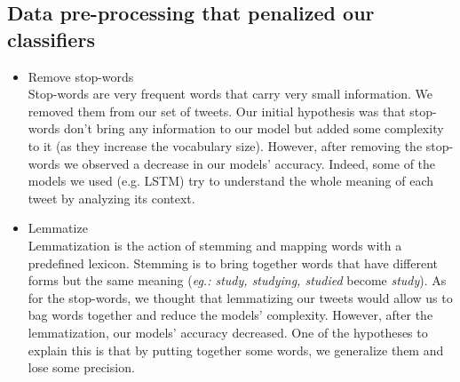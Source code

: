 \documentclass[letterpaper, 10 pt, conference]{ieeeconf}  %
\begin{document}
\subsection{Data pre-processing that penalized our classifiers}
\begin{itemize}
    \item Remove stop-words \ \\
    Stop-words are very frequent words that carry very small information. 
    We removed them from our set of tweets. Our initial hypothesis was that stop-words don't bring any information to our model but added some complexity to it (as they increase the vocabulary size). However, after removing the stop-words we observed a decrease in our models' accuracy.
    Indeed, some of the models we used (e.g. LSTM) try to understand the whole meaning of each tweet by analyzing its context.\vspace*{0,25\baselineskip}
    \item Lemmatize \ \\
    Lemmatization is the action of stemming and mapping words with a predefined lexicon. Stemming is to bring together words that have different forms but the same meaning (\textit{eg.: study, studying, studied} become \textit{study}).
    As for the stop-words, we thought that lemmatizing our tweets would allow us to bag words together and reduce the models' complexity. However, after the lemmatization, our models' accuracy decreased.
    One of the hypotheses to explain this is that by putting together some words, we generalize them and lose some precision.
\end{itemize}
\end{document}

